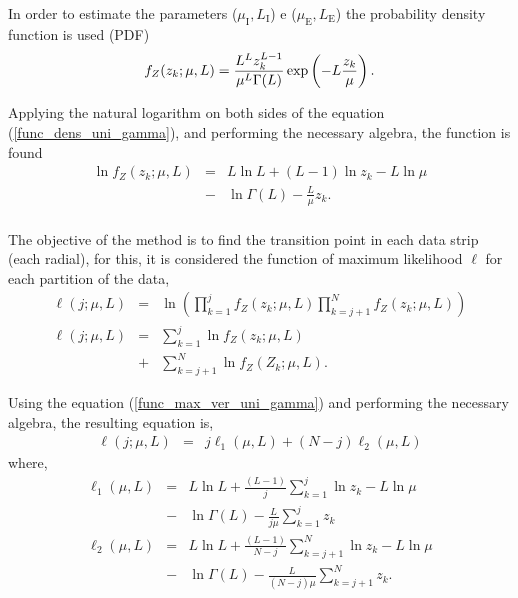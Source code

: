 \documentclass[conference]{IEEEtran}
\begin{document}
In order to estimate the parameters ($\mu_\text{I},L_\text{I}$) e ($\mu_\text{E},L_\text{E}$)  the probability density function is used (PDF)
\begin{equation}\label{func_dens_uni_gamma}
	f_Z(z_k;\mu,L)=\frac{L^{L}z_k^{L-1}}{\mu^{L}\Gamma(L)} \exp\left(-L\frac{z_k}{\mu}\right). \\
\end{equation}

Applying the natural logarithm on both sides of the equation (\ref{func_dens_uni_gamma}), and performing  the necessary algebra,  the function is found
\begin{equation}\label{func_max_ver_uni_gamma}
\begin{array}{lcl}
	\ln f_Z(z_k;\mu,L)&=& L\ln L +(L - 1) \ln z_k-L \ln \mu \\
	 	                  &-& \ln \Gamma(L) -\frac{L}{\mu} z_k.\\
\end{array}
\end{equation}

The objective of the method is to find the transition point in each data  strip (each radial), for this, it is considered the function of maximum likelihood $\ell$ for each partition of the data,
\begin{equation}\nonumber
\begin{array}{lcl}
 \ell(j;\mu, L)&=&\ln\left(\prod_{k=1}^{j}f_{Z}(z_k;\mu,L)\prod_{k=j+1}^{N}f_{Z}(z_k;\mu,L)\right)\\
 \ell(j;\mu, L)&=&\sum_{k=1}^{j}\ln f_{Z}(z_k;\mu,L)\\
             &+&\sum_{k=j+1}^{N}\ln f_{Z}(Z_k;\mu,L).
 \end{array}
 \end{equation}
 
Using the equation (\ref{func_max_ver_uni_gamma}) and performing the necessary algebra, the resulting equation is, 
\begin{equation}\label{func_l_param}
\begin{array}{ccc}  
  \ell(j;\mu, L)&=&j\ell_1(\mu, L) + (N - j)\ell_2(\mu, L)
 \end{array}
 \end{equation}
where,
 \begin{equation}
\begin{array}{lcl}\label{func_l_param_1_2}
    \ell_1(\mu, L)&=&L\ln L+\frac{(L-1)}{j}\sum_{k=1}^{j}\ln z_k-L\ln\mu\\
    &-&\ln\Gamma(L) -\frac{L}{j\mu}\sum_{k=1}^{j} z_k\\
    \ell_2(\mu, L)&=&L\ln L+\frac{(L-1)}{N-j}\sum_{k=j+1}^{N}\ln z_k-L\ln\mu\\
    &-&\ln\Gamma(L) -\frac{L}{(N-j)\mu}\sum_{k=j+1}^{N} z_k.
 \end{array}
 \end{equation}
 
\end{document}
